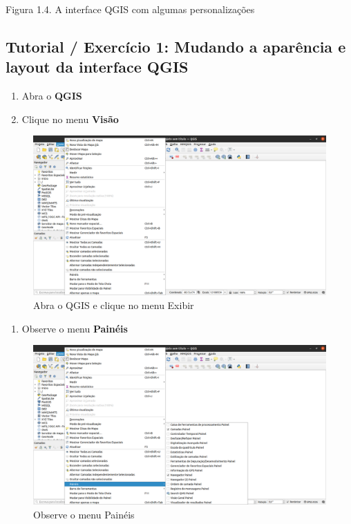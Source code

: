 \documentclass[
  portuguese,
]{krantz}
\providecommand{\tightlist}{%
  \setlength{\itemsep}{0pt}\setlength{\parskip}{0pt}}
\begin{document}
Figura 1.4. A interface QGIS com algumas personalizações

\hypertarget{tutorial-exercuxedcio-1-mudando-a-aparuxeancia-e-layout-da-interface-qgis}{%
\subsection{\texorpdfstring{\textbf{Tutorial / Exercício 1: Mudando a aparência e layout da interface QGIS}}{Tutorial / Exercício 1: Mudando a aparência e layout da interface QGIS}}\label{tutorial-exercuxedcio-1-mudando-a-aparuxeancia-e-layout-da-interface-qgis}}

\begin{enumerate}
\def\labelenumi{\arabic{enumi}.}
\tightlist
\item
  Abra o \textbf{QGIS}
\item
  Clique no menu \textbf{Visão}
\end{enumerate}

\begin{figure}
\centering
\includegraphics{media/modulo1/ex01-01.png}
\caption{Abra o QGIS e clique no menu Exibir}
\end{figure}

\begin{enumerate}
\def\labelenumi{\arabic{enumi}.}
\setcounter{enumi}{2}
\tightlist
\item
  Observe o menu \textbf{Painéis}
\end{enumerate}

\begin{figure}
\centering
\includegraphics{media/modulo1/ex01-02.png}
\caption{Observe o menu Painéis}
\end{figure}
\end{document}
